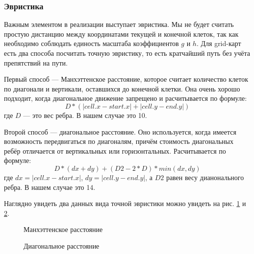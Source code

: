 \subsubsection{Эвристика}
Важным элементом в реализации выступает эвристика. Мы не будет считать простую дистанцию между координатами текущей и конечной клеток, так как необходимо соблюдать единость масштаба коэффициентов $g$ и $h$. Для grid-карт есть два способа посчитать точную эвристику, то есть кратчайший путь без учёта препятствий на пути.

Первый способ — Манхэттенское расстояние, которое считает количество клеток по диагонали и вертикали, оставшихся до конечной клетки. Она очень хорошо подходит, когда диагональное движение запрещено и расчитывается по формуле:
$$
D * (|cell.x - start.x|+|cell.y-end.y|)
$$ где $D$ — это вес ребра. В нашем случае это 10.

Второй способ — диагональное расстояние. Оно используется, когда имеется возможность передвигаться по диагоналям, причём стоимость диагональных ребёр отличается от вертикальных или горизонтальных. Расчитывается по формуле:
$$
D * (dx + dy) + (D2 - 2 * D) * min(dx, dy)
$$ где $dx=|cell.x - start.x|$, $dy=|cell.y-end.y|$, а $D2$ равен весу дианонального ребра. В нашем случае это 14.

Наглядно увидеть два данных вида точной эвристики можно увидеть на рис. \ref{manh} и \ref{diag}.

\begin{figure}[h]
\caption{Манхэттенское расстояние}
\label{manh}
\end{figure}

\begin{figure}[h]
\caption{Диагональное расстояние}
\label{diag}
\end{figure}

